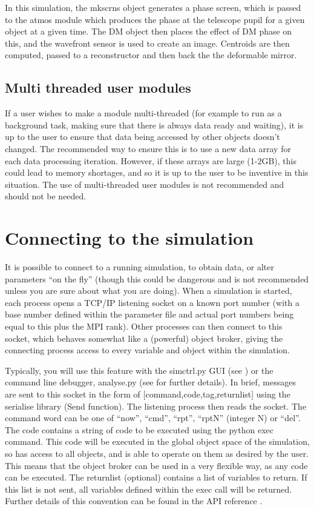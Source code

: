 \documentclass{article}
\begin{document}
In this simulation, the mkscrns object generates a phase screen, which
is passed to the atmos module which produces the phase at the
telescope pupil for a given object at a given time.  The DM object
then places the effect of DM phase on this, and the wavefront sensor
is used to create an image.  Centroids are then computed, passed to a
reconstructor and then back the the deformable mirror.


\subsection{Multi threaded user modules}
If a user wishes to make a module multi-threaded (for example to run
as a background task, making sure that there is always data ready and
waiting), it is up to the user to ensure that data being accessed by
other objects doesn't changed.  The recommended way to ensure this is
to use a new data array for each data processing iteration.  However,
if these arrays are large (1-2GB), this could lead to memory
shortages, and so it is up to the user to be inventive in this
situation.  The use of multi-threaded user modules is not recommended
and should not be needed.

\section{Connecting to the simulation}
It is possible to connect to a running simulation, to obtain data, or
alter parameters ``on the fly'' (though this could be dangerous and is
not recommended unless you are sure about what you are doing).  When a
simulation is started, each process opens a TCP/IP listening socket on
a known port number (with a base number defined within the parameter
file and actual port numbers being equal to this plus the MPI rank).
Other processes can then connect to this socket, which behaves
somewhat like a (powerful) object broker, giving the connecting
process access to every variable and object within the simulation.

Typically, you will use this feature with the simctrl.py GUI (see
\citet{simctrlgui}) or the command line debugger, analyse.py (see
\citet{apidoc} for further details).  In brief, messages are sent to
this socket in the form of [command,code,tag,returnlist] using the
serialise library (Send function).  The listening process then reads
the socket.  The command word can be one of ``now'', ``cmd'', ``rpt'',
``rptN'' (integer N) or ``del''.  The code contains a string of code
to be executed using the python exec command.  This code will be
executed in the global object space of the simulation, so has access
to all objects, and is able to operate on them as desired by the user.
This means that the object broker can be used in a very flexible way,
as any code can be executed.  The returnlist (optional) contains a
list of variables to return.  If this list is not sent, all variables
defined within the exec call will be returned.  Further details of
this convention can be found in the API reference \citep{apidoc}.
\end{document}
